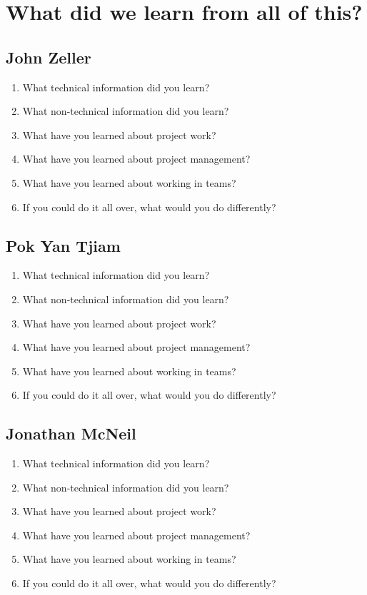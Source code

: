 \documentclass[12pt]{article}
\begin{document}
\section{What did we learn from all of this?}
\subsection{John Zeller}
\begin{enumerate}
    \item What technical information did you learn?
    \item What non-technical information did you learn?
    \item What have you learned about project work?
    \item What have you learned about project management?
    \item What have you learned about working in teams?
    \item If you could do it all over, what would you do differently? 
\end{enumerate}

\subsection{Pok Yan Tjiam}
\begin{enumerate}
    \item What technical information did you learn?
    \item What non-technical information did you learn?
    \item What have you learned about project work?
    \item What have you learned about project management?
    \item What have you learned about working in teams?
    \item If you could do it all over, what would you do differently? 
\end{enumerate}

\subsection{Jonathan McNeil}
\begin{enumerate}
    \item What technical information did you learn?
    \item What non-technical information did you learn?
    \item What have you learned about project work?
    \item What have you learned about project management?
    \item What have you learned about working in teams?
    \item If you could do it all over, what would you do differently? 
\end{enumerate}
\end{document}
